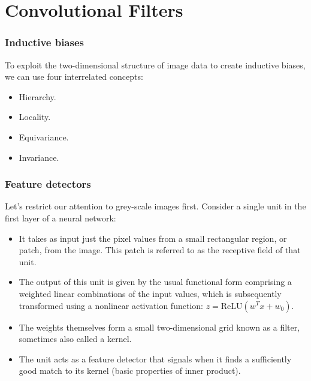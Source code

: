 \documentclass{beamer}
\begin{document}
\section{Convolutional Filters}

\begin{frame}
    \frametitle{Inductive biases}
    To exploit the two-dimensional structure of image data to create inductive biases, we can use four interrelated concepts:
    \begin{itemize}
        \item Hierarchy.
        \item Locality.
        \item Equivariance.
        \item Invariance.
    \end{itemize}
\end{frame}

\begin{frame}
    \frametitle{Feature detectors}
    Let's restrict our attention to grey-scale images first. Consider a single unit in the first layer of a neural network:
    \begin{itemize}
        \item It takes as input just the pixel values from a small rectangular region, or patch, from the image. This patch is referred to as the receptive field of that unit.
        \item The output of this unit is given by the usual functional form comprising a weighted linear combinations of the input values, which is subsequently transformed using a nonlinear activation function: $z=\mathrm{ReLU}(w^{T}x+w_{0})$.
        \item The weights themselves form a small two-dimensional grid known as a filter, sometimes also called a kernel.
        \item The unit acts as a feature detector that signals when it finds a sufficiently good match to its kernel (basic properties of inner product).
    \end{itemize}
\end{frame}
\end{document}
